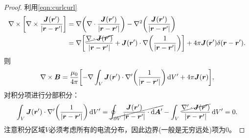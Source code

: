 \begin{proof}
    利用\eqref{eqn:curlcurl}
    \begin{align*}
        \nabla\times\biggl[\nabla\times\frac{\bm J(\bm r')}{\lvert\bm r - \bm r'\rvert}\biggr] &= \nabla\biggl(\nabla\cdot\frac{\bm J(\bm r')}{\lvert\bm r - \bm r'\rvert}\biggr) - \nabla^2\biggl(\frac{\bm J(\bm r')}{\lvert\bm r - \bm r'\rvert}\biggr)\\
        &= \nabla\biggl[\frac{\cancel{\nabla\cdot\bm J(\bm r')}}{\lvert\bm r - \bm r'\rvert} + \bm J(\bm r') \cdot \nabla\biggl(\frac1{\lvert\bm r - \bm r'\rvert}\biggr)\biggr] + 4\pi\bm J(\bm r')\delta(\bm r - \bm r').
    \end{align*}
    则
    \[
        \nabla\times\bm B = \frac{\mu_0}{4\pi}\biggl[-\nabla\int_V\bm J(\bm r') \cdot \nabla'\biggl(\frac1{\lvert\bm r - \bm r'\rvert}\biggr)\mathop{}\!\mathrm{d} V' + 4\pi\bm J(\bm r)\biggr],
    \]
    对积分项进行分部积分：
    \[
        \int_V\bm J(\bm r') \cdot \nabla'\biggl(\frac1{\lvert\bm r - \bm r'\rvert}\biggr)\mathop{}\!\mathrm{d} V' = \cancel{\oint_{\partial V}\frac{\bm J(\bm r')}{\lvert\bm r - \bm r'\rvert} \cdot \mathop{}\!\mathrm{d}\bm A'} - \int_V\frac{\cancel{\nabla' \cdot \bm J(\bm r')}}{\lvert\bm r - \bm r'\rvert}\mathop{}\!\mathrm{d} V' = 0.
    \]
    注意积分区域$V$必须考虑所有的电流分布，因此边界(一般是无穷远处)项为0。
\end{proof}

